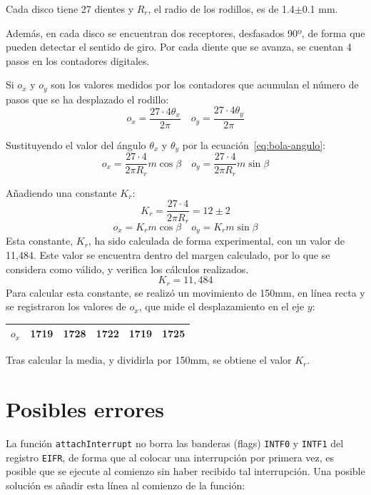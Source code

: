 \documentclass[10pt,a4paper,hidelinks,twocolumn]{article}
\begin{document}

Cada disco tiene 27 dientes y $R_r$, el radio de los rodillos, es de 
1.4$\pm$0.1 mm.

Además, en cada disco se encuentran dos receptores, desfasados 90º, de forma que 
pueden detectar el sentido de giro. Por cada diente que se avanza, se cuentan 4 
pasos en los contadores digitales.

Si $o_x$ y $o_y$ son los valores medidos por los contadores que acumulan el 
número de pasos que se ha desplazado el rodillo:
$$o_x = \frac{27 \cdot 4 \theta_x}{2\pi} \quad 
o_y = \frac{27 \cdot 4 \theta_y}{2\pi}$$

Sustituyendo el valor del ángulo $\theta_x$ y $\theta_y$ por la 
ecuación~\ref{eq:bola-angulo}:
$$ o_x = \frac{27\cdot4}{2 \pi R_r} m \cos \beta \quad
	o_y = \frac{27\cdot4}{2 \pi R_r} m \sin \beta $$

Añadiendo una constante $K_r$:
$$K_r = \frac{27\cdot4}{2 \pi R_r} = 12\pm2$$
$$ o_x = K_r m \cos \beta \quad
	o_y = K_r m \sin \beta $$
Esta constante, $K_r$, ha sido calculada de forma experimental, con un valor de 
11,484. Este valor se encuentra dentro del margen calculado, por lo que se 
considera como válido, y verifica los cálculos realizados.
$$K_r = 11,484$$
Para calcular esta constante, se realizó un movimiento de 150mm, en línea recta 
y se registraron los valores de $o_x$, que mide el desplazamiento en el eje $y$:

\begin{center}
\begin{tabular}{ | c | c | c | c | c | c |}
\hline
$o_x$ & 1719 & 1728 & 1722 & 1719 & 1725 \\ \hline
\end{tabular}
\end{center}

Tras calcular la media, y dividirla por 150mm, se obtiene el valor $K_r$.



\section{Posibles errores}

La función \texttt{attachInterrupt} no borra las banderas (flags) \texttt{INTF0} 
y \texttt{INTF1} del registro \texttt{EIFR}, de forma que al colocar una 
interrupción por primera vez, es posible que se ejecute al comienzo sin haber 
recibido tal interrupción. Una posible solución es añadir esta línea al comienzo 
de la función:
\end{document}
